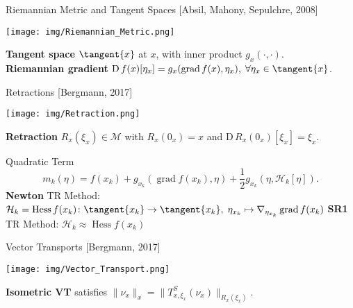 \documentclass{beamer}
\begin{document}
\begin{frame}{Riemannian Metric and Tangent Spaces}
    \vspace{-1\baselineskip}\hfill{\tiny{[Absil, Mahony, Sepulchre, 2008]}}
    \begin{center}
        \texttt{[image: img/Riemannian\_Metric.png]}
    \end{center}
    \textbf{Tangent space} $\tangent{x}$ at $x$, with inner product $g_x(\cdot, \cdot)$. \\[0.2\baselineskip]
    \textbf{Riemannian gradient} $\mathrm{D} \, f(x) [\eta_x] = g_x (\operatorname{grad} f(x), \eta_x), \; \forall \eta_x \in \tangent{x}$. \\[0.2\baselineskip]
\end{frame}

\begin{frame}{Retractions}
    \vspace{-1\baselineskip}\hfill{\tiny{[Bergmann, 2017]}}
    \begin{center}
        \texttt{[image: img/Retraction.png]}
    \end{center}
    \textbf{Retraction} $R_{x}(\xi_x) \in \mathcal{M}$ with $R_x (0_x) = x$ and $\mathrm{D} \, R_x (0_x)[\xi_x] = \xi_x$.
\end{frame}

\begin{frame}{Quadratic Term}
	\begin{equation*}
		m_k(\eta) = f(x_k) + g_{x_k}(\operatorname{grad}f(x_k), \eta) + \frac{1}{2} g_{x_k}(\eta, \mathcal{H}_k [\eta]).
	\end{equation*}
    \textbf{Newton} TR Method: $\mathcal{H}_k = \operatorname{Hess} f(x_k) \colon \tangent{x_k} \to \tangent{x_k}, \; \eta_{x_k} \mapsto \nabla_{\eta_{x_k}} \operatorname{grad} f(x_k)$
	\textbf{SR1} TR Method: $\mathcal{H}_k \approx \operatorname{Hess} f(x_k)$
\end{frame}

\begin{frame}{Vector Transports}
    \vspace{-1\baselineskip}\hfill{\tiny{[Bergmann, 2017]}}
    \begin{center}
        \texttt{[image: img/Vector\_Transport.png]}
    \end{center}
    \textbf{Isometric VT} satisfies $\lVert \nu_x \rVert_x = \lVert T^{S}_{x, \xi_x}(\nu_x) \rVert_{R_x(\xi_x)}$.
\end{frame}
\end{document}
